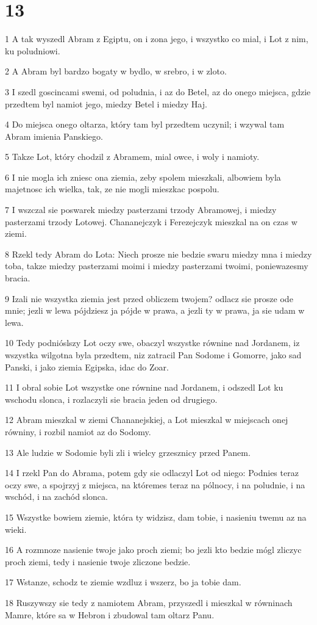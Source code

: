 \chapter{13}

\par 1 A tak wyszedl Abram z Egiptu, on i zona jego, i wszystko co mial, i Lot z nim, ku poludniowi.
\par 2 A Abram byl bardzo bogaty w bydlo, w srebro, i w zloto.
\par 3 I szedl goscincami swemi, od poludnia, i az do Betel, az do onego miejsca, gdzie przedtem byl namiot jego, miedzy Betel i miedzy Haj.
\par 4 Do miejsca onego oltarza, który tam byl przedtem uczynil; i wzywal tam Abram imienia Panskiego.
\par 5 Takze Lot, który chodzil z Abramem, mial owce, i woly i namioty.
\par 6 I nie mogla ich zniesc ona ziemia, zeby spolem mieszkali, albowiem byla majetnosc ich wielka, tak, ze nie mogli mieszkac pospolu.
\par 7 I wszczal sie poswarek miedzy pasterzami trzody Abramowej, i miedzy pasterzami trzody Lotowej. Chananejczyk i Ferezejczyk mieszkal na on czas w ziemi.
\par 8 Rzekl tedy Abram do Lota: Niech prosze nie bedzie swaru miedzy mna i miedzy toba, takze miedzy pasterzami moimi i miedzy pasterzami twoimi, poniewazesmy bracia.
\par 9 Izali nie wszystka ziemia jest przed obliczem twojem? odlacz sie prosze ode mnie; jezli w lewa pójdziesz ja pójde w prawa, a jezli ty w prawa, ja sie udam w lewa.
\par 10 Tedy podnióslszy Lot oczy swe, obaczyl wszystke równine nad Jordanem, iz wszystka wilgotna byla przedtem, niz zatracil Pan Sodome i Gomorre, jako sad Panski, i jako ziemia Egipska, idac do Zoar.
\par 11 I obral sobie Lot wszystke one równine nad Jordanem, i odszedl Lot ku wschodu slonca, i rozlaczyli sie bracia jeden od drugiego.
\par 12 Abram mieszkal w ziemi Chananejskiej, a Lot mieszkal w miejscach onej równiny, i rozbil namiot az do Sodomy.
\par 13 Ale ludzie w Sodomie byli zli i wielcy grzesznicy przed Panem.
\par 14 I rzekl Pan do Abrama, potem gdy sie odlaczyl Lot od niego: Podnies teraz oczy swe, a spojrzyj z miejsca, na któremes teraz na pólnocy, i na poludnie, i na wschód, i na zachód slonca.
\par 15 Wszystke bowiem ziemie, która ty widzisz, dam tobie, i nasieniu twemu az na wieki.
\par 16 A rozmnoze nasienie twoje jako proch ziemi; bo jezli kto bedzie mógl zliczyc proch ziemi, tedy i nasienie twoje zliczone bedzie.
\par 17 Wstanze, schodz te ziemie wzdluz i wszerz, bo ja tobie dam.
\par 18 Ruszywszy sie tedy z namiotem Abram, przyszedl i mieszkal w równinach Mamre, które sa w Hebron i zbudowal tam oltarz Panu.

